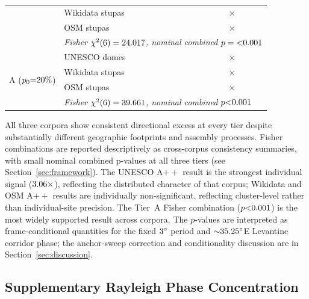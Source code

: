 \documentclass[12pt,a4paper]{article}
\newcommand{\degr}{\ifmmode^\circ\else\textdegree{}\fi}
\begin{document}
\begin{table}[ht]
\begin{tabular}{llrrrrrl}
  & Wikidata stupas & \geoWikiApN{}  & \geoWikiApHits{}  & \geoWikiApExp{}  & \geoWikiApEnr{}$\times$  & \geoWikiApP{}  & \geoWikiApSig{} \\
  & OSM stupas      & \geoOsmApN{}   & \geoOsmApHits{}   & \geoOsmApExp{}   & \geoOsmApEnr{}$\times$   & \geoOsmApP{}   & \geoOsmApSig{} \\
  & \multicolumn{7}{l}{\textit{Fisher $\chi^2(6) = 24.017{}$, nominal combined $p = {<}0.001{}$}} \\
\midrule
\multirow{4}{*}{A ($p_0{=}20\%{}$)}
  & UNESCO domes    & \geoDomeAN{}   & \geoDomeAHits{}   & \geoDomeAExp{}   & \geoDomeAEnr{}$\times$   & \geoDomeAP{}   & \geoDomeASig{} \\
  & Wikidata stupas & \geoWikiAN{}   & \geoWikiAHits{}   & \geoWikiAExp{}   & \geoWikiAEnr{}$\times$   & \geoWikiAP{}   & \geoWikiASig{} \\
  & OSM stupas      & \geoOsmAN{}    & \geoOsmAHits{}    & \geoOsmAExp{}    & \geoOsmAEnr{}$\times$    & \geoOsmAP{}    & \geoOsmASig{} \\
  & \multicolumn{7}{l}{\textit{Fisher $\chi^2(6) = 39.661{}$, nominal combined $p {<}0.001{}$}} \\
\bottomrule
\end{tabular}
\end{table}

All three corpora show consistent directional excess at every tier
despite substantially different geographic footprints and assembly
processes. Fisher combinations are reported descriptively as
cross-corpus consistency summaries, with small nominal combined p-values
at all three tiers
(see Section~\ref{sec:framework}). The UNESCO A$++$ result is the
strongest individual signal ($3.06{}\times$), reflecting the
distributed character of that corpus; Wikidata and OSM A$++$ results
are individually non-significant, reflecting cluster-level rather than
individual-site precision. The Tier~A Fisher combination
($p {<}0.001{}$) is the most widely supported result across
corpora. The $p$-values are interpreted as frame-conditional
quantities for the fixed $3\degr$ period and ${\sim}35.25\degr$E
Levantine corridor phase;
the anchor-sweep correction and conditionality discussion are in
Section~\ref{sec:discussion}.

\subsection{Supplementary Rayleigh Phase Concentration}
\end{document}
